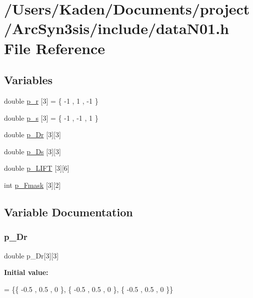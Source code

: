 \hypertarget{a00506}{}\section{/\+Users/\+Kaden/\+Documents/project/\+Arc\+Syn3sis/include/data\+N01.h File Reference}
\label{a00506}
\subsection*{Variables}
\begin{DoxyCompactItemize}
\item 
double \hyperlink{a00506_a7e52da56416e11a4783c0aa859d6b478}{p\+\_\+r} \mbox{[}3\mbox{]} = \{ -\/1 , 1 , -\/1 \}
\item 
double \hyperlink{a00506_a4c959c774f208d54bee20ec721ff52fe}{p\+\_\+s} \mbox{[}3\mbox{]} = \{ -\/1 , -\/1 , 1 \}
\item 
double \hyperlink{a00506_a718230132f9add142e28fd9078b7a818}{p\+\_\+\+Dr} \mbox{[}3\mbox{]}\mbox{[}3\mbox{]}
\item 
double \hyperlink{a00506_afe9c30056feb5271f416346c6ea6c40e}{p\+\_\+\+Ds} \mbox{[}3\mbox{]}\mbox{[}3\mbox{]}
\item 
double \hyperlink{a00506_a162ef160c01b03cd05791dc9a6acc934}{p\+\_\+\+L\+I\+FT} \mbox{[}3\mbox{]}\mbox{[}6\mbox{]}
\item 
int \hyperlink{a00506_a19c5c57b7dc71eb0fbdc015125cce46a}{p\+\_\+\+Fmask} \mbox{[}3\mbox{]}\mbox{[}2\mbox{]}
\end{DoxyCompactItemize}


\subsection{Variable Documentation}
\mbox{\label{a00506_a718230132f9add142e28fd9078b7a818}} 
\subsubsection{\texorpdfstring{p\+\_\+\+Dr}{p\_Dr}}
{\footnotesize\ttfamily double p\+\_\+\+Dr\mbox{[}3\mbox{]}\mbox{[}3\mbox{]}}

{\bfseries Initial value\+:}
\begin{DoxyCode}
= \{\{             -0.5 ,               0.5 ,                 0 \},
\{             -0.5 ,               0.5 ,                 0 \},
\{             -0.5 ,               0.5 ,                 0 \}\}
\end{DoxyCode}
\mbox{\label{a00506_afe9c30056feb5271f416346c6ea6c40e}} 
